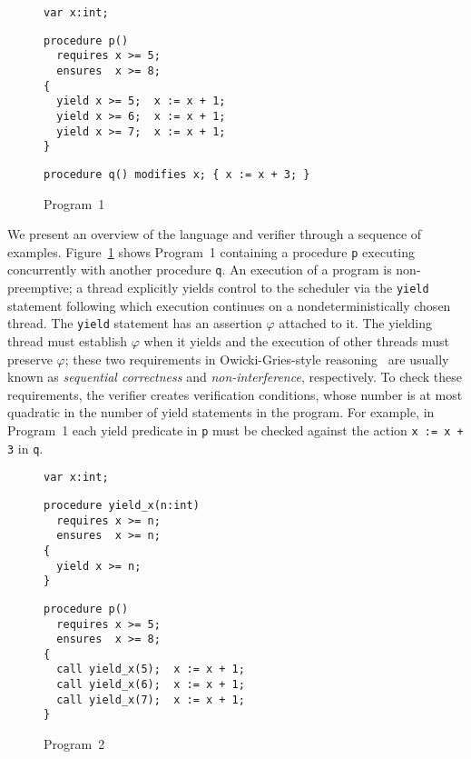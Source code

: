 \begin{figure}
\begin{verbatim}
var x:int;
\end{verbatim}
\begin{verbatim}
procedure p()
  requires x >= 5;
  ensures  x >= 8;
{
  yield x >= 5;  x := x + 1;
  yield x >= 6;  x := x + 1;
  yield x >= 7;  x := x + 1;
}
\end{verbatim}
\begin{verbatim}
procedure q() modifies x; { x := x + 3; }
\end{verbatim}
\caption{Program~1}
\label{fig:ex1}
\end{figure}

We present an overview of the \civl language and verifier through a sequence of examples.
Figure~\ref{fig:ex1} shows Program~1 containing a procedure {\tt p}
executing concurrently with another procedure {\tt q}. 
An execution of a \civl program is non-preemptive; a thread explicitly yields control to the
scheduler via the {\tt yield} statement following which execution continues on a 
nondeterministically chosen thread.
The {\tt yield} statement has an assertion $\varphi$ attached to it.
The yielding thread must establish $\varphi$ when it yields and the execution of other threads 
must preserve $\varphi$; these two requirements in Owicki-Gries-style
reasoning~\cite{OwickiG76} are usually known as {\em sequential correctness}
and {\em non-interference}, respectively.
To check these requirements, the \civl verifier creates verification conditions, whose number is at most
quadratic in the number of yield statements in the program.
For example, in Program~1 each yield predicate in {\tt p} must be checked against the action 
{\tt x := x + 3} in {\tt q}.


\begin{figure}
\begin{verbatim}
var x:int;
\end{verbatim}
\begin{verbatim}
procedure yield_x(n:int)
  requires x >= n;
  ensures  x >= n;
{
  yield x >= n;
}
\end{verbatim}
\begin{verbatim}
procedure p()
  requires x >= 5;
  ensures  x >= 8;
{
  call yield_x(5);  x := x + 1;
  call yield_x(6);  x := x + 1;
  call yield_x(7);  x := x + 1;
}
\end{verbatim}
\caption{Program~2}
\label{fig:ex2}
\end{figure}

